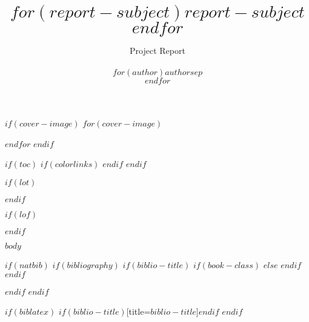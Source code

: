 \documentclass[$if(fontsize)$$fontsize$,$endif$$if(lang)$$babel-lang$,$endif$$if(papersize)$$papersize$paper,$endif$$for(classoption)$$classoption$$sep$,$endfor$]{$documentclass$}
\title{\Huge $for(report-subject)$$report-subject$$endfor$}
\author{\LARGE Project Report \\ \\ \LARGE $for(author)$$author$$sep$ \\ $endfor$}
\begin{document}
\begin{titlingpage}
\maketitle

$if(cover-image)$
$for(cover-image)$
   \begin{center}
   \end{center}
$endfor$
$endif$
\end{titlingpage}

\newpage


$if(toc)$
{
$if(colorlinks)$
\hypersetup{linkcolor=$if(toccolor)$$toccolor$$else$black$endif$}
$endif$
\setcounter{tocdepth}{$toc-depth$}
\tableofcontents
\newpage
}
$endif$

$if(lot)$
\listoftables
\newpage
$endif$

$if(lof)$
\listoffigures
\newpage
$endif$

\setcounter{page}{1}

$body$

$if(natbib)$
$if(bibliography)$
$if(biblio-title)$
$if(book-class)$
\renewcommand\bibname{$biblio-title$}
$else$
\renewcommand\refname{$biblio-title$}
$endif$
$endif$

$endif$
$endif$

$if(biblatex)$
\printbibliography$if(biblio-title)$[title=$biblio-title$]$endif$
$endif$
\end{document}
